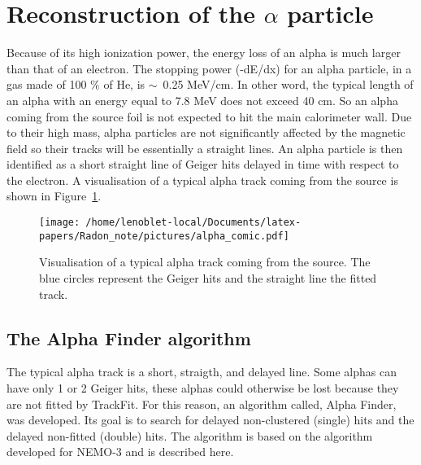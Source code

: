 \documentclass[main.tex]{subfiles}
\begin{document}


\section{Reconstruction of the $\alpha$ particle}


Because of its high ionization power, the energy loss of an alpha is much larger than that of an electron. The stopping power (-dE/dx) for an alpha particle, in a gas made of 100 \% of He, is $\sim$~0.25 MeV/cm. In other word, the typical length of an alpha with an energy equal to 7.8 MeV does not exceed 40 cm. So an alpha coming from the source foil is not expected to hit the main calorimeter wall. Due to their high mass, alpha particles are not significantly affected by the magnetic field so their tracks will be essentially a straight lines. An alpha particle is then identified as a short straight line of Geiger hits delayed in time with respect to the electron. A visualisation of a typical alpha track coming from the source is shown in Figure~\ref{visu_alpha_typical_track}.


\begin{figure}[h!]
\begin{center}
\texttt{[image: /home/lenoblet-local/Documents/latex-papers/Radon\_note/pictures/alpha\_comic.pdf]}
\caption{Visualisation of a typical alpha track coming from the source. The blue circles represent the Geiger hits and the straight line the fitted track.}
\label{visu_alpha_typical_track}
\end{center}
\end{figure}


\subsection{The Alpha Finder algorithm}
\noindent The typical alpha track is a short, straigth, and delayed line. Some alphas can have only 1 or 2 Geiger hits, these alphas could otherwise be lost because they are not fitted by TrackFit. For this reason, an algorithm called, Alpha Finder, was developed. Its goal is to search for delayed non-clustered (single) hits and the delayed non-fitted (double) hits. The algorithm is based on the algorithm developed for NEMO-3 and is described here. %
\end{document}
